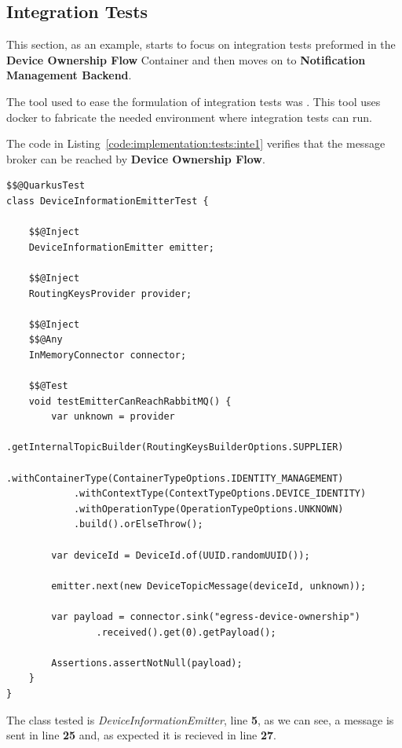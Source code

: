 \subsection{Integration Tests}
\label{subsec:implementation:tests:integration}

This section, as an example, starts to focus on integration tests preformed in the \textbf{Device Ownership Flow} Container and then moves on to \textbf{Notification Management Backend}.

The tool used to ease the formulation of integration tests was . This tool uses docker to fabricate the needed environment where integration tests can run.

The code in Listing~\ref{code:implementation:tests:inte1} verifies that the message broker can be reached by \textbf{Device Ownership Flow}.

\begin{lstlisting}[style=Java, caption=Integration Test - Message Broker - \textbf{Device Ownership Flow}, label={code:implementation:tests:inte1}]
$$@QuarkusTest
class DeviceInformationEmitterTest {

    $$@Inject
    DeviceInformationEmitter emitter;

    $$@Inject
    RoutingKeysProvider provider;

    $$@Inject
    $$@Any
    InMemoryConnector connector;

    $$@Test
    void testEmitterCanReachRabbitMQ() {
        var unknown = provider
            .getInternalTopicBuilder(RoutingKeysBuilderOptions.SUPPLIER)
            .withContainerType(ContainerTypeOptions.IDENTITY_MANAGEMENT)
            .withContextType(ContextTypeOptions.DEVICE_IDENTITY)
            .withOperationType(OperationTypeOptions.UNKNOWN)
            .build().orElseThrow();

        var deviceId = DeviceId.of(UUID.randomUUID());
        
        emitter.next(new DeviceTopicMessage(deviceId, unknown));

        var payload = connector.sink("egress-device-ownership")
                .received().get(0).getPayload();
        
        Assertions.assertNotNull(payload);
    }
}
\end{lstlisting}

The class tested is \textit{DeviceInformationEmitter}, line \textbf{5}, as we can see, a message is sent in line \textbf{25} and, as expected it is recieved in line \textbf{27}.


